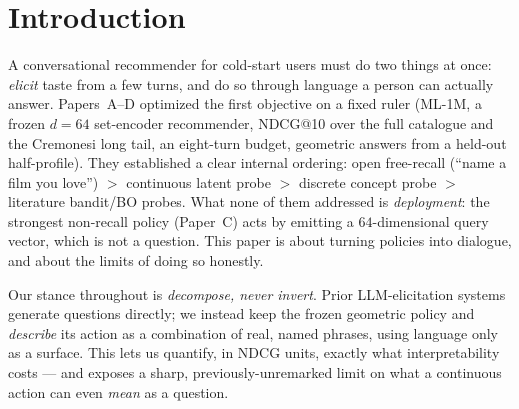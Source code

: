 \documentclass[11pt]{article}
\begin{document}
\section{Introduction}
A conversational recommender for cold-start users must do two things at once: \emph{elicit} taste from a few turns,
and do so through language a person can actually answer. Papers~A--D optimized the first objective on a fixed ruler
(ML-1M, a frozen $d{=}64$ set-encoder recommender, NDCG@10 over the full catalogue and the Cremonesi long tail, an
eight-turn budget, geometric answers from a held-out half-profile). They established a clear internal ordering: open
free-recall (``name a film you love'') $>$ continuous latent probe $>$ discrete concept probe $>$ literature
bandit/BO probes. What none of them addressed is \emph{deployment}: the strongest non-recall policy (Paper~C) acts by
emitting a $64$-dimensional query vector, which is not a question. This paper is about turning policies into dialogue,
and about the limits of doing so honestly.

Our stance throughout is \emph{decompose, never invert}. Prior LLM-elicitation systems generate questions directly;
we instead keep the frozen geometric policy and \emph{describe} its action as a combination of real, named phrases,
using language only as a surface. This lets us quantify, in NDCG units, exactly what interpretability costs --- and
exposes a sharp, previously-unremarked limit on what a continuous action can even \emph{mean} as a question.
\end{document}
